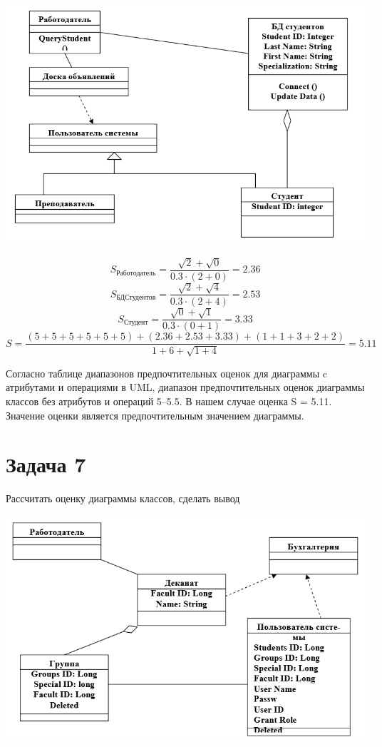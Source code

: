 \documentclass{article}
\begin{document}
\includegraphics[width=\textwidth]{task6.png}

$$S_{\text{Работодатель}} = \frac{\sqrt{2} + \sqrt{0}}{0.3 \cdot (2 + 0)} = 2.36$$
$$S_{\text{БДСтудентов}} = \frac{\sqrt{2} + \sqrt{4}}{0.3 \cdot (2 + 4)} = 2.53$$
$$S_{\text{Студент}} = \frac{\sqrt{0} + \sqrt{1}}{0.3 \cdot (0 + 1)} = 3.33$$
$$S = \frac{(5 + 5 + 5 + 5 + 5 + 5) + (2.36 + 2.53 + 3.33) + (1 + 1 + 3 + 2 + 2)} {1 + 6 + \sqrt{1 + 4}} = 5.11$$

Согласно таблице диапазонов предпочтительных оценок для диаграммы c атрибутами и операциями в UML, диапазон предпочтительных оценок диаграммы классов без атрибутов и операций 5–5.5. В нашем случае оценка S = 5.11. Значение оценки является предпочтительным значением диаграммы.

\section{Задача 7}
Рассчитать оценку диаграммы классов, сделать вывод

\includegraphics[width=\textwidth]{task7.png}
\end{document}
